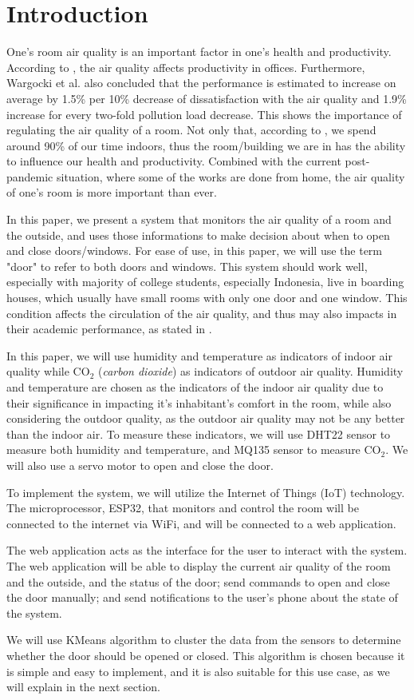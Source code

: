 \section{Introduction}
One's room air quality is an important factor in one's health and productivity.
According to \cite{productivity_air_quality_wargocki_2000}, the air quality affects productivity in offices. Furthermore, Wargocki et al. also concluded that the performance is estimated to increase on average by 1.5\% per 10\% decrease of dissatisfaction with the air quality and 1.9\% increase for every two-fold pollution load decrease. This shows the importance of regulating the air quality of a room.
Not only that, according to \cite{indoor_air_quality_stafford_2015}, we spend around 90\% of our time indoors, thus the room/building we are in has the ability to influence our health and productivity.
Combined with the current post-pandemic situation, where some of the works are done from home, the air quality of one's room is more important than ever.

In this paper, we present a system that monitors the air quality of a room and the outside, and uses those informations to make decision about when to open and close doors/windows.
For ease of use, in this paper, we will use the term "door" to refer to both doors and windows.
This system should work well, especially with majority of college students, especially Indonesia, live in boarding houses, which usually have small rooms with only one door and one window. This condition affects the circulation of the air quality, and thus may also impacts in their academic performance, as stated in \cite{indoor_air_quality_stafford_2015}.

In this paper, we will use humidity and temperature as indicators of indoor air quality while CO$_2$ (\textit{carbon dioxide}) as indicators of outdoor air quality.
Humidity and temperature are chosen as the indicators of the indoor air quality due to their significance in impacting it's inhabitant's comfort in the room, while also considering the outdoor quality, as the outdoor air quality may not be any better than the indoor air.
To measure these indicators, we will use DHT22 sensor to measure both humidity and temperature, and MQ135 sensor to measure CO$_2$. We will also use a servo motor to open and close the door.

To implement the system, we will utilize the Internet of Things (IoT) technology.
The microprocessor, ESP32, that monitors and control the room will be connected to the internet via WiFi, and will be connected to a web application.

The web application acts as the interface for the user to interact with the system.
The web application will be able to display the current air quality of the room and the outside, and the status of the door; send commands to open and close the door manually; and send notifications to the user's phone about the state of the system.

We will use KMeans algorithm to cluster the data from the sensors to determine whether the door should be opened or closed. This algorithm is chosen because it is simple and easy to implement, and it is also suitable for this use case, as we will explain in the next section.
